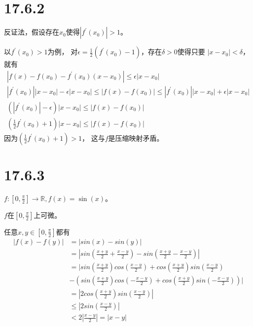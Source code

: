 \documentclass{article}
\begin{document}
\section*{17.6.2}

反证法，假设存在$x_0$使得$|f^\prime(x_0)| > 1$。

以$f^\prime(x_0) > 1$为例，
对$\epsilon = \frac{1}{2}(f^\prime(x_0) - 1)$，存在$\delta > 0$使得只要
$|x - x_0| < \delta$，就有
\begin{align*}
  |f(x) - f(x_0) - f^\prime(x_0)(x - x_0)| \leq \epsilon |x - x_0|                                                      \\
  |f^\prime(x_0)||x - x_0| - \epsilon |x - x_0| \leq |f(x) - f(x_0)| \leq |f^\prime(x_0)||x - x_0| + \epsilon |x - x_0| \\
  (|f^\prime(x_0)| - \epsilon)|x - x_0| \leq |f(x) - f(x_0)|                                                            \\
  (\frac{1}{2}f^\prime(x_0) + 1)|x - x_0| \leq |f(x) - f(x_0)|
\end{align*}
因为$(\frac{1}{2}f^\prime(x_0) + 1) > 1$，
这与$f$是压缩映射矛盾。

\section*{17.6.3}

$f: [0, \frac{\pi}{2}] \to \mathbb{R}, f(x) = \sin(x)$。

$f$在$[0, \frac{\pi}{2}]$上可微。

任意$x, y \in [0, \frac{\pi}{2}]$都有
\begin{align*}
  |f(x) - f(y)|
   & = |sin(x) - sin(y)|                                                                        \\
   & = |sin(\frac{x + y}{2} + \frac{x - y}{2}) - sin(\frac{x + y}{2} - \frac{x - y}{2})|        \\
   & = |sin(\frac{x + y}{2})cos(\frac{x - y}{2}) + cos(\frac{x + y}{2})sin(\frac{x - y}{2})     \\
   & - (sin(\frac{x + y}{2})cos(-\frac{x - y}{2}) + cos(\frac{x + y}{2})sin(-\frac{x - y}{2}))| \\
   & = |2 cos(\frac{x + y}{2})sin(\frac{x - y}{2})|                                             \\
   & \leq |2 sin(\frac{x - y}{2})|                                                              \\
   & < 2 |\frac{x - y}{2}| = |x - y|
\end{align*}
\end{document}
